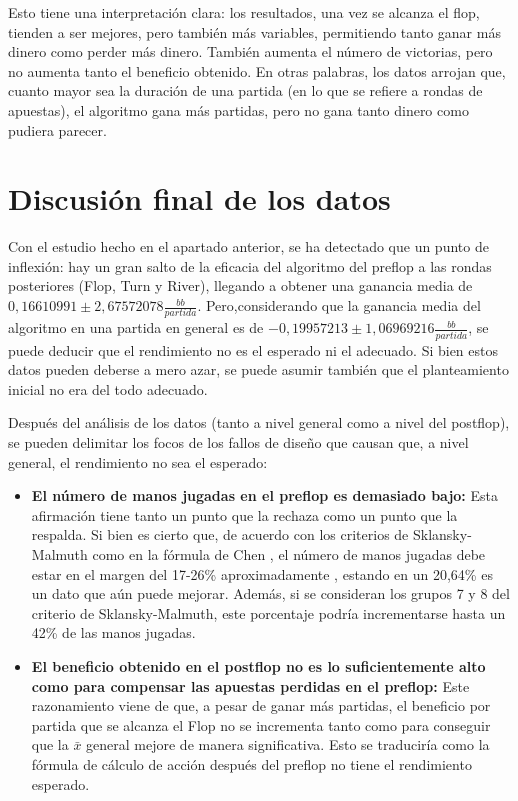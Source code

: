 Esto tiene una interpretación clara: los resultados, una vez se alcanza el flop, tienden a ser mejores, pero también más variables, permitiendo tanto ganar más dinero como perder más dinero. También aumenta el número de victorias, pero no aumenta tanto el beneficio obtenido. 
 En otras palabras, los datos arrojan que, cuanto mayor sea la duración de una partida (en lo que se refiere a rondas de apuestas), el algoritmo gana más partidas, pero no gana tanto dinero como pudiera parecer.


\section{Discusión final de los datos}
\label{sec:discusion}

Con el estudio hecho en el apartado anterior, se ha detectado que un punto de inflexión: hay un gran salto de la eficacia del algoritmo del preflop a las rondas posteriores (Flop, Turn y River), llegando a obtener una ganancia media de $0,16610991\pm 2,67572078 $$\frac{bb}{partida}$. 
Pero,considerando que la ganancia media del algoritmo en una partida en general es de $-0,19957213\pm1,06969216$$\frac{bb}{partida}$, se puede deducir que el rendimiento no es el esperado ni el adecuado. Si bien estos datos pueden deberse a mero azar, se puede asumir también que el planteamiento inicial no era del todo adecuado.

Después del análisis de los datos (tanto a nivel general como a nivel del postflop), se pueden delimitar los focos de los fallos de diseño que causan que, a nivel general, el rendimiento no sea el esperado:

\begin{itemize}
\item \textbf{El número de manos jugadas en el preflop es demasiado bajo:} Esta afirmación tiene tanto un punto que la rechaza como un punto que la respalda. Si bien es cierto que, de acuerdo con los criterios de Sklansky-Malmuth \cite{sklansky} como en la fórmula de Chen \cite{krieger}, el número de manos jugadas debe estar en el margen del 17-26\% aproximadamente , estando en un 20,64\% es un dato que aún puede mejorar. Además, si se consideran los grupos 7 y 8 del criterio de Sklansky-Malmuth, este porcentaje podría incrementarse hasta un 42\% de las manos jugadas.
\item \textbf{El beneficio obtenido en el postflop no es lo suficientemente alto como para compensar las apuestas perdidas en el preflop:} Este razonamiento viene de que, a pesar de ganar más partidas, el beneficio por partida que se alcanza el Flop no se incrementa tanto como para conseguir que la $\bar{x}$ general mejore de manera significativa. Esto se traduciría como la fórmula de cálculo de acción después del preflop no tiene el rendimiento esperado.
\end{itemize}

